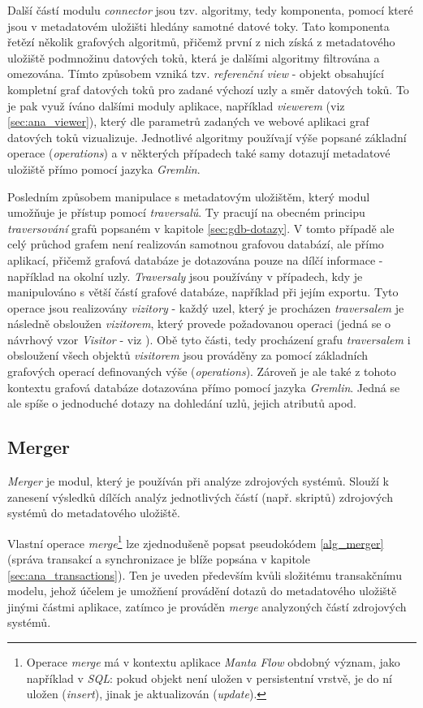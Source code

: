 Další částí modulu \textit{connector} jsou tzv. algoritmy, tedy komponenta, pomocí které jsou v metadatovém uložišti hledány samotné datové toky. Tato komponenta řetězí několik grafových algoritmů, přičemž první z nich získá z metadatového uložiště podmnožinu datových toků, která je dalšími algoritmy filtrována a omezována. Tímto způsobem vzniká tzv. \textit{referenční view} - objekt obsahující kompletní graf datových toků pro zadané výchozí uzly a směr datových toků. To je pak využ   íváno dalšími moduly aplikace, například \textit{viewerem} (viz \ref{sec:ana_viewer}), který dle parametrů zadaných ve webové aplikaci graf datových toků vizualizuje.
Jednotlivé algoritmy používají výše popsané základní operace (\textit{operations}) a v některých případech také samy dotazují metadatové uložiště přímo pomocí jazyka \textit{Gremlin}.

Posledním způsobem manipulace s metadatovým uložištěm, který modul umožňuje je přístup pomocí \textit{traversalů}. Ty pracují na obecném principu \textit{traversování} grafů popsaném v kapitole \ref{sec:gdb-dotazy}. V tomto případě ale celý průchod grafem není realizován samotnou grafovou databází, ale přímo aplikací, přičemž grafová databáze je dotazována pouze na dílčí informace - například na okolní uzly. \textit{Traversaly} jsou používány v případech, kdy je manipulováno s větší částí grafové databáze, například při jejím exportu. Tyto operace jsou realizovány \textit{vizitory} - každý uzel, který je procházen \textit{traversalem} je následně obsloužen \textit{vizitorem}, který provede požadovanou operaci (jedná se o návrhový vzor \textit{Visitor} - viz \cite{Gamma94}). Obě tyto části, tedy procházení grafu \textit{traversalem} i obsloužení všech objektů \textit{visitorem} jsou prováděny za pomocí základních grafových operací definovaných výše (\textit{operations}). Zároveň je ale také z tohoto kontextu grafová databáze dotazována přímo pomocí jazyka \textit{Gremlin}. Jedná se ale spíše o jednoduché dotazy na dohledání uzlů, jejich atributů apod.

\subsection{Merger}
\label{sec:ana_merger}
\textit{Merger} je modul, který je používán při analýze zdrojových systémů. Slouží k zanesení výsledků dílčích analýz jednotlivých částí (např. skriptů) zdrojových systémů do metadatového uložiště.

Vlastní operace \textit{merge}\footnote{Operace \textit{merge} má v kontextu aplikace \textit{Manta Flow} obdobný význam, jako například v \textit{SQL}: pokud objekt není uložen v persistentní vrstvě, je do ní uložen (\textit{insert}), jinak je aktualizován (\textit{update}).} lze zjednodušeně popsat pseudokódem \ref{alg_merger} (správa transakcí a synchronizace je blíže popsána v kapitole \ref{sec:ana_transactions}). Ten je uveden především kvůli složitému transakčnímu modelu, jehož účelem je umožňení provádění dotazů do metadatového uložiště jinými částmi aplikace, zatímco je prováděn \textit{merge} analyzoných částí zdrojových systémů.

